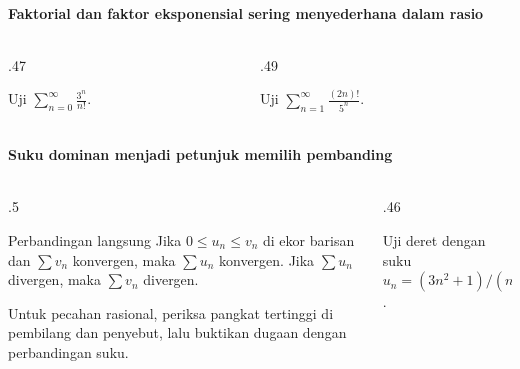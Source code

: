 \documentclass{../../kalkulus-ppt}
\begin{document}
\begin{frame}{\insertsection}
    \framesubtitle{Faktorial dan faktor eksponensial sering menyederhana dalam rasio}
    \begin{columns}[T,onlytextwidth]
        \begin{column}{.47\textwidth}
            \begin{contoh}
                Uji $\displaystyle\sum_{n=0}^\infty \frac{3^n}{n!}$.
            \end{contoh}
        \end{column}
        \begin{column}{.49\textwidth}
            \begin{contoh}
                Uji $\displaystyle\sum_{n=1}^\infty\frac{(2n)!}{5^n}$.
            \end{contoh}
        \end{column}
    \end{columns}
\end{frame}

\begin{frame}{\insertsection}
    \framesubtitle{Suku dominan menjadi petunjuk memilih pembanding}
    \begin{columns}[c,onlytextwidth]
        \begin{column}{.5\textwidth}
            \begin{block}{Perbandingan langsung}
                Jika $0\le u_n\le v_n$ di ekor barisan dan
                $\sum v_n$ konvergen, maka $\sum u_n$ konvergen.
                Jika $\sum u_n$ divergen, maka $\sum v_n$ divergen.
            \end{block}
            Untuk pecahan rasional, periksa pangkat tertinggi
            di pembilang dan penyebut, lalu buktikan dugaan
            dengan perbandingan suku.
        \end{column}
        \begin{column}{.46\textwidth}
            \begin{contoh}
                Uji deret dengan suku $u_n=(3n^2+1)/(n^4+2n)$.
            \end{contoh}
        \end{column}
    \end{columns}
\end{frame}
\end{document}
